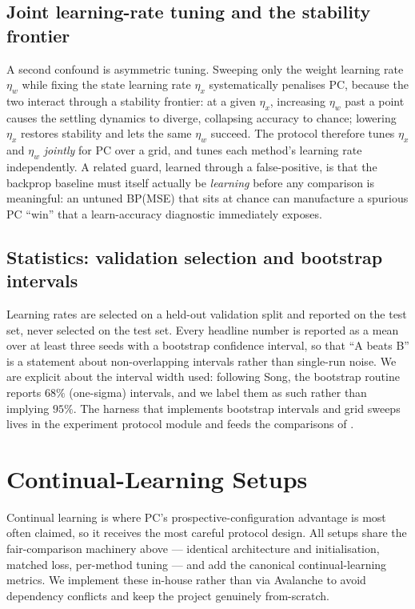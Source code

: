 \subsection{Joint learning-rate tuning and the stability frontier}

A second confound is asymmetric tuning. Sweeping only the weight learning rate $\eta_w$ while fixing the
state learning rate $\eta_x$ systematically penalises PC, because the two interact through a stability
frontier: at a given $\eta_x$, increasing $\eta_w$ past a point causes the settling dynamics to diverge,
collapsing accuracy to chance; lowering $\eta_x$ restores stability and lets the same $\eta_w$ succeed.
The protocol therefore tunes $\eta_x$ and $\eta_w$ \emph{jointly} for PC over a grid, and tunes each
method's learning rate independently. A related guard, learned through a false-positive, is that the
backprop baseline must itself actually be \emph{learning} before any comparison is meaningful: an
untuned BP(MSE) that sits at chance can manufacture a spurious PC ``win'' that a learn-accuracy
diagnostic immediately exposes.

\subsection{Statistics: validation selection and bootstrap intervals}

Learning rates are selected on a held-out validation split and reported on the test set, never selected
on the test set. Every headline number is reported as a mean over at least three seeds with a bootstrap
confidence interval, so that ``A beats B'' is a statement about non-overlapping intervals rather than
single-run noise. We are explicit about the interval width used: following Song, the bootstrap routine
reports $68\%$ (one-sigma) intervals, and we label them as such rather than implying $95\%$. The harness
that implements bootstrap intervals and grid sweeps lives in the experiment protocol module and feeds
the comparisons of .

\section{Continual-Learning Setups}\label{sec:method-continual}

Continual learning is where PC's prospective-configuration advantage is most often claimed, so it
receives the most careful protocol design. All setups share the fair-comparison machinery above ---
identical architecture and initialisation, matched loss, per-method tuning --- and add the canonical
continual-learning metrics. We implement these in-house rather than via Avalanche
\citep{lomonaco2021avalanche} to avoid dependency conflicts and keep the project genuinely
from-scratch.

